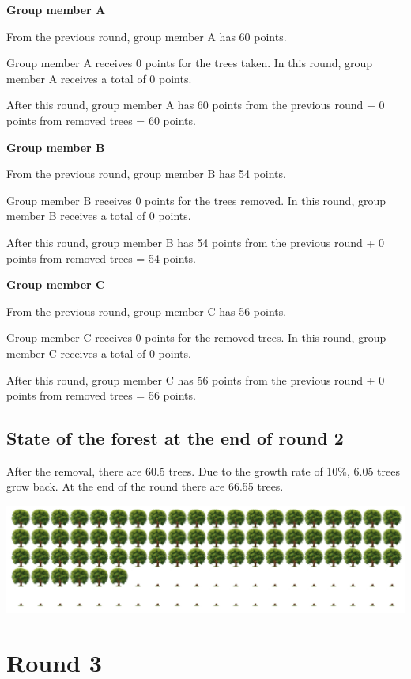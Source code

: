 \noindent\textbf{Group member A}

\noindent From the previous round, group member A has 60 points.

\noindent Group member A receives 0 points for the trees taken. In this round, group member A receives a total of 0 points.

\noindent After this round, group member A has 60 points from the previous round + 0 points from removed trees = 60 points.

\noindent \textbf{Group member B}

\noindent From the previous round, group member B has 54 points.

\noindent Group member B receives 0 points for the trees removed. In this round, group member B receives a total of 0 points.

\noindent After this round, group member B has 54 points from the previous round + 0 points from removed trees = 54 points.

\noindent \textbf{Group member C}

\noindent From the previous round, group member C has 56 points.

\noindent Group member C receives 0 points for the removed trees. In this round, group member C receives a total of 0 points.

\noindent After this round, group member C has 56 points from the previous round + 0 points from removed trees = 56 points.

\subsection*{State of the forest at the end of round 2}

\noindent After the removal, there are 60.5 trees. Due to the growth rate of 10\%, 6.05 trees grow back. At the end of the round there are 66.55 trees.
\begin{center}
   \includegraphics[width=16cm]{../bld/graphs/A. Round2c.png}
\end{center}

\section*{Round 3}

